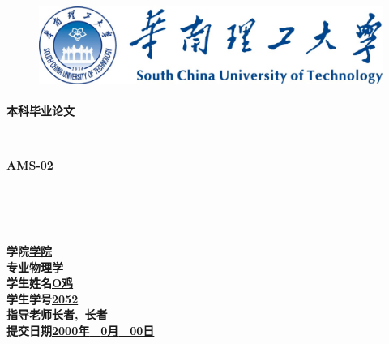 \documentclass[a4paper]{article}
\begin{document}
\thispagestyle{empty}
\begin{figure}[ht]
\centering
\includegraphics[height=2.75cm]{title.png}
\end{figure}
\begin{center}
\textbf{本科毕业论文}
\end{center}
\nopagebreak[4]
\begin{center}
\ \\
\end{center}
\nopagebreak[4]
\begin{center}
\textbf{AMS-02}%
\end{center}
\nopagebreak[4]
\begin{center}
\ \\
\ \\
\ \\
\end{center}
\nopagebreak[4]
\begin{spacing}{1.8}
\begin{center}
\textbf{学\quad\quad 院}\quad\underline{\quad\quad\textbf{学院}\quad\quad}\\
\textbf{专\quad\quad 业}\quad\underline{\quad\quad\quad\textbf{物理学}\quad\quad\quad}\\
\textbf{学生姓名}\quad\underline{\quad\quad\quad\quad\textbf{O鸡}\quad\quad\quad\quad}\\
\textbf{学生学号}\quad\underline{\quad\quad\textbf{2052}\quad\quad}\\
\textbf{指导老师}\quad\underline{\quad\quad\textbf{长者,\ 长者}\quad\quad}\\
\textbf{提交日期}\quad\underline{\quad\textbf{2000年}\ \ \textbf{0月}\ \ \textbf{00日}\quad}
\end{center}
\end{spacing}
\pagebreak[4]
\end{document}

